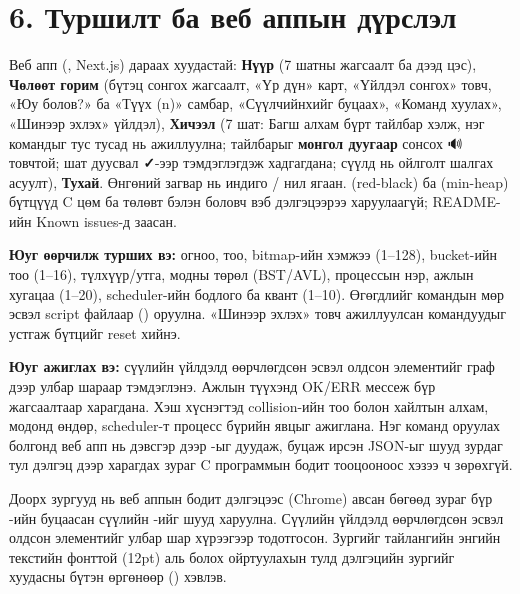 \section*{6. Туршилт ба веб аппын дүрслэл}

Веб апп (, Next.js) дараах хуудастай: \textbf{Нүүр} (7 шатны жагсаалт ба дээд цэс), \textbf{Чөлөөт горим} (бүтэц сонгох жагсаалт, «Үр дүн» карт, «Үйлдэл сонгох» товч, «Юу болов?» ба «Түүх (n)» самбар, «Сүүлчийнхийг буцаах», «Команд хуулах», «Шинээр эхлэх» үйлдэл), \textbf{Хичээл} (7 шат: Багш алхам бүрт тайлбар хэлж, нэг командыг тус тусад нь ажиллуулна; тайлбарыг \textbf{монгол дуугаар} сонсох 🔊 товчтой; шат дуусвал \textbf{✓}-ээр тэмдэглэгдэж хадгагдана; сүүлд нь ойлголт шалгах асуулт), \textbf{Тухай}. Өнгөний загвар нь индиго / нил ягаан.  (red-black) ба  (min-heap) бүтцүүд C цөм ба  төлөвт бэлэн боловч вэб дэлгэцээрээ харуулаагүй; README-ийн Known issues-д заасан.

\textbf{Юуг өөрчилж турших вэ:} огноо, тоо, bitmap-ийн хэмжээ (1--128), bucket-ийн тоо (1--16), түлхүүр/утга, модны төрөл (BST/AVL), процессын нэр, ажлын хугацаа (1--20), scheduler-ийн бодлого ба квант (1--10). Өгөгдлийг командын мөр эсвэл script файлаар () оруулна. «Шинээр эхлэх» товч ажиллуулсан командуудыг устгаж бүтцийг reset хийнэ.

\textbf{Юуг ажиглах вэ:} сүүлийн үйлдэлд өөрчлөгдсөн эсвэл олдсон элементийг граф дээр улбар шараар тэмдэглэнэ. Ажлын түүхэнд OK/ERR мессеж бүр жагсаалтаар харагдана. Хэш хүснэгтэд collision-ийн тоо болон хайлтын алхам, модонд өндөр, scheduler-т процесс бүрийн явцыг ажиглана. Нэг команд оруулах болгонд веб апп нь дэвсгэр дээр -ыг дуудаж, буцаж ирсэн JSON-ыг шууд зурдаг тул дэлгэц дээр харагдах зураг C программын бодит тооцооноос хэзээ ч зөрөхгүй.

Доорх зургууд нь веб аппын бодит дэлгэцээс (Chrome) авсан бөгөөд зураг бүр -ийн буцаасан сүүлийн -ийг шууд харуулна. Сүүлийн үйлдэлд өөрчлөгдсөн эсвэл олдсон элементийг улбар шар хүрээгээр тодотгосон. Зургийг тайлангийн энгийн текстийн фонттой (12pt) аль болох ойртуулахын тулд дэлгэцийн зургийг хуудасны бүтэн өргөнөөр () хэвлэв.

